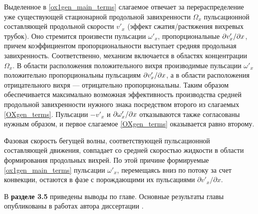 Выделенное в \eqref{ox1gen_main_terms} слагаемое отвечает за перераспределение уже существующей стационарной продольной завихренности $\Omega_x$ пульсационной составляющей продольной скорости $v'_x$ (эффект сжатия/растяжения вихревых трубок). Оно стремится произвести пульсации $\omega'_x$, пропорциональные $\partial v'_x / \partial x$, причем коэффициентом пропорциональности выступает средняя продольная завихренность. Соответственно, механизм включается в областях концентрации~$\Omega_x$. В области расположения положительного вихря производимые пульсации $\omega'_x$ положительно пропорциональны пульсациям $\partial v'_x / \partial x$, а в области расположения отрицательного вихря --- отрицательно пропорциональны. Таким образом обеспечивается максимально возможная эффективность производства средней продольной завихренности нужного знака посредством второго из слагаемых \eqref{OXgen_terms}. Пульсации $-v'_x$ и $\partial \omega'_x / \partial x$ отказываются также согласованы нужным образом, и первое слагаемое \eqref{OXgen_terms} оказывается равно второму.

Фазовая скорость бегущей волны, соответствующей пульсационной составляющей движения, совпадает со средней скоростью жидкости в области формирования продольных вихрей. По этой причине формируемые \eqref{ox1gen_main_terms} пульсации $\omega'_x$, перемещаясь вниз по потоку за счет конвекции, остаются в фазе с порождающими их пульсациями $\partial v'_x / \partial x$.

В \textbf{разделе 3.5} приведены выводы по главе. Основные результаты главы опубликованы в работах автора диссертации \cite{MZG2017,  KMU17}.

 
